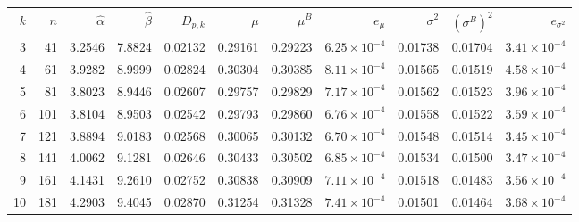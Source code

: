 \begin{tabular}{@{}rrrrrrrrrrr@{}}
\hline
$k$ & $n$ & $\widehat\alpha$ & $\widehat\beta$ & $D_{p,k}$ & $\mu$ & $\mu^B$ & $e_\mu$ & $\sigma^2$ & $(\sigma^B)^2$ & $e_{\sigma^2}$ \\
\hline
3 & 41 & 3.2546 & 7.8824 & 0.02132 & 0.29161 & 0.29223 & $6.25\times10^{-4}$ & 0.01738 & 0.01704 & $3.41\times10^{-4}$ \\
4 & 61 & 3.9282 & 8.9999 & 0.02824 & 0.30304 & 0.30385 & $8.11\times10^{-4}$ & 0.01565 & 0.01519 & $4.58\times10^{-4}$ \\
5 & 81 & 3.8023 & 8.9446 & 0.02607 & 0.29757 & 0.29829 & $7.17\times10^{-4}$ & 0.01562 & 0.01523 & $3.96\times10^{-4}$ \\
6 & 101 & 3.8104 & 8.9503 & 0.02542 & 0.29793 & 0.29860 & $6.76\times10^{-4}$ & 0.01558 & 0.01522 & $3.59\times10^{-4}$ \\
7 & 121 & 3.8894 & 9.0183 & 0.02568 & 0.30065 & 0.30132 & $6.70\times10^{-4}$ & 0.01548 & 0.01514 & $3.45\times10^{-4}$ \\
8 & 141 & 4.0062 & 9.1281 & 0.02646 & 0.30433 & 0.30502 & $6.85\times10^{-4}$ & 0.01534 & 0.01500 & $3.47\times10^{-4}$ \\
9 & 161 & 4.1431 & 9.2610 & 0.02752 & 0.30838 & 0.30909 & $7.11\times10^{-4}$ & 0.01518 & 0.01483 & $3.56\times10^{-4}$ \\
10 & 181 & 4.2903 & 9.4045 & 0.02870 & 0.31254 & 0.31328 & $7.41\times10^{-4}$ & 0.01501 & 0.01464 & $3.68\times10^{-4}$ \\
\hline
\end{tabular}
